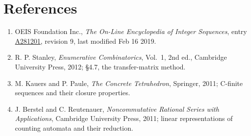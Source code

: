 \documentclass[11pt]{article}
\theoremstyle{definition}
\begin{document}
\section{References}

\begin{enumerate}

\item OEIS Foundation Inc., \emph{The On-Line Encyclopedia of Integer Sequences}, entry \href{https://oeis.org/A281201}{A281201}, revision 9, last modified Feb 16 2019.

\item R. P. Stanley, \emph{Enumerative Combinatorics}, Vol.~1, 2nd ed., Cambridge University Press, 2012; \S4.7, the transfer-matrix method.

\item M. Kauers and P. Paule, \emph{The Concrete Tetrahedron}, Springer, 2011; C-finite sequences and their closure properties.

\item J. Berstel and C. Reutenauer, \emph{Noncommutative Rational Series with Applications}, Cambridge University Press, 2011; linear representations of counting automata and their reduction.

\end{enumerate}
\end{document}
